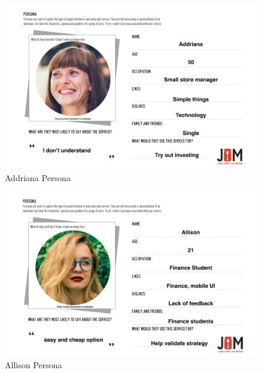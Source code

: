 \documentclass[main.tex]{subfiles}
\begin{document}
 \begin{figure}[H]
    \centering
    \includegraphics[angle=90,origin=c,width=1.1\textwidth,height=0.8\textheight]{08Appendices/085Background/085Pictures/Addriana_per.png}
    \caption{Addriana Persona}
 \end{figure}


 \begin{figure}[H]
    \centering
    \includegraphics[angle=90,origin=c,width=1.1\textwidth,height=0.8\textheight]{08Appendices/085Background/085Pictures/Allison_per.png}
    \caption{Allison Persona}
 \end{figure}
 
\end{document}
